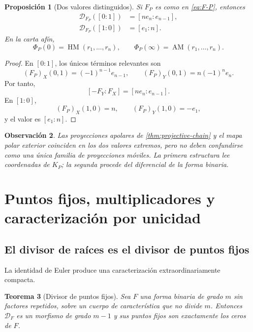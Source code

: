 \documentclass[11pt,oneside]{scrartcl}
\theoremstyle{plainblue}
\newtheorem{theorem}{Teorema}[section]
\newtheorem{proposition}[theorem]{Proposición}
\theoremstyle{definitionblue}
\theoremstyle{remarkgray}
\newtheorem{remark}[theorem]{Observación}
\newcommand{\AM}{\operatorname{AM}}
\newcommand{\HM}{\operatorname{HM}}
\newcommand{\cD}{\mathcal{D}}
\begin{document}
\begin{proposition}[Dos valores distinguidos]\label{prop:Phi-endpoints}
Si \(F_P\) es como en \cref{eq:F-P}, entonces
\begin{align}
\cD_{F_P}([0:1])&=[ne_n:e_{n-1}],\label{eq:Phi-zero-hom}\\
\cD_{F_P}([1:0])&=[e_1:n].\label{eq:Phi-infinity-hom}
\end{align}
En la carta afín,
\begin{equation}\label{eq:Phi-endpoint-means}
\boxed{
\Phi_P(0)=\HM(r_1,\dots,r_n),
\qquad
\Phi_P(\infty)=\AM(r_1,\dots,r_n).}
\end{equation}
\end{proposition}

\begin{proof}
En \([0:1]\), los únicos términos relevantes son
\[
(F_P)_X(0,1)=(-1)^{n-1}e_{n-1},
\qquad
(F_P)_Y(0,1)=n(-1)^ne_n.
\]
Por tanto,
\[
[-F_Y:F_X]=[ne_n:e_{n-1}].
\]
En \([1:0]\),
\[
(F_P)_X(1,0)=n,
\qquad
(F_P)_Y(1,0)=-e_1,
\]
y el valor es \([e_1:n]\).
\end{proof}

\begin{remark}
Las proyecciones apolares de \cref{thm:projective-chain} y el mapa polar exterior
coinciden en los dos valores extremos, pero no deben confundirse como una única
familia de proyecciones móviles. La primera estructura lee coordenadas de \(K_P\);
la segunda procede del diferencial de la forma binaria.
\end{remark}

\section{Puntos fijos, multiplicadores y caracterización por unicidad}

\subsection{El divisor de raíces es el divisor de puntos fijos}

La identidad de Euler produce una caracterización extraordinariamente compacta.

\begin{theorem}[Divisor de puntos fijos]\label{thm:fixed-divisor}
Sea \(F\) una forma binaria de grado \(m\) sin factores repetidos, sobre un cuerpo de
característica que no divide \(m\). Entonces \(\cD_F\) es un morfismo de grado
\(m-1\) y sus puntos fijos son exactamente los ceros de \(F\).
\end{theorem}
\end{document}
